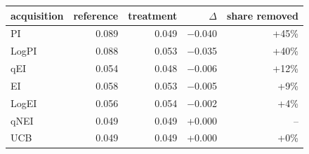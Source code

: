 \begin{tabular}{lrrrr}
\toprule
acquisition & reference & treatment & $\Delta$ & share removed \\
\midrule
PI & 0.089 & 0.049 & $-$0.040 & +45\% \\
LogPI & 0.088 & 0.053 & $-$0.035 & +40\% \\
qEI & 0.054 & 0.048 & $-$0.006 & +12\% \\
EI & 0.058 & 0.053 & $-$0.005 & +9\% \\
LogEI & 0.056 & 0.054 & $-$0.002 & +4\% \\
qNEI & 0.049 & 0.049 & +0.000 & -- \\
UCB & 0.049 & 0.049 & +0.000 & +0\% \\
\bottomrule
\end{tabular}
